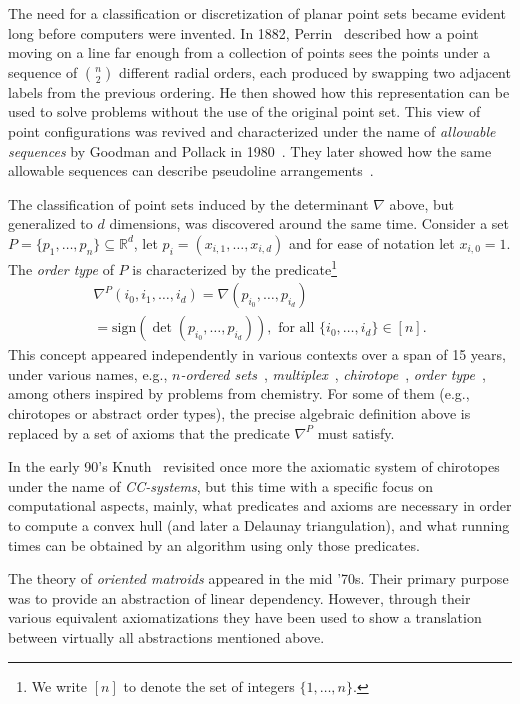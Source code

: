 \documentclass[leqno,12pt]{article}
\def\R{\mathbb{R}}
\begin{document}
The need for a classification or discretization of planar point sets
became evident long before computers were invented. 
In 1882,
Perrin~\cite{Perrin1882} described how a point moving on a line far enough from a
collection of points sees the points under a sequence of $n\choose 2$
different radial orders, each produced by swapping two adjacent labels
from the previous ordering. He then showed how this representation
can be used to solve problems without the use of the original
point set. This view of point configurations was revived and
characterized under the name of \emph{allowable sequences} 
by Goodman and Pollack in 1980~\cite{Goodman1980220}. They later showed how the same
allowable sequences can describe pseudoline arrangements~\cite{Goodman1984257}.

The classification of point sets induced by the determinant $\nabla$ above, but
generalized to $d$ dimensions, was discovered around the same time.
Consider a set $P = \{p_1,\ldots,p_n\}\subseteq\R^d$, let $p_i = (x_{i,1},\ldots,x_{i,d})$ and for ease of notation let $x_{i,0}=1$.
The \emph{order type} of $P$ is characterized  by the predicate\footnote{We write $[n]$ to denote the set of integers $\{1,\ldots,n\}$.}
\begin{multline*}
\nabla^P(i_0,i_1,\ldots,i_d) = \nabla(p_{i_0},\ldots,p_{i_d})\\
= \text{sign}(\det(p_{i_0},\ldots,p_{i_d})),
\text{ for all }\{i_0,\ldots,i_d\}\in [n].
\end{multline*}
This concept appeared independently in various contexts over a span of 15
years, under various names, e.g., 
\emph{$n$-ordered sets}~\cite{Novoa}, \emph{multiplex}~\cite{multiplex},
\emph{chirotope}~\cite{dreiding},
\emph{order type}~\cite{goodman_pollack_83_sorting}, among others inspired by problems from chemistry.
For some of them (e.g., chirotopes or abstract order types), 
the precise algebraic definition above is replaced by a set of axioms that the
predicate $\nabla^P$ must satisfy. 

In the early 90's Knuth~\cite{DBLP:books/sp/Knuth92} revisited once more the axiomatic system of
chirotopes under the name of \emph{CC-systems}, but this time with a
specific focus on computational aspects, mainly, what predicates and
axioms are necessary in order to compute a convex hull (and later a
Delaunay triangulation), and what running times can be obtained by an
algorithm using only those predicates.

The theory of \emph{oriented matroids}
 appeared in the mid
'70s. Their primary purpose was to provide an abstraction of linear
dependency.  However, through their various equivalent axiomatizations
they have been used to show a translation between virtually all
abstractions mentioned above. 
\end{document}
